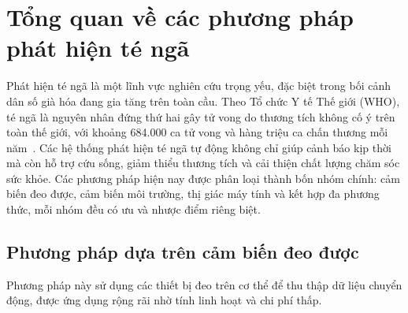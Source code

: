 \section{Tổng quan về các phương pháp phát hiện té ngã}

Phát hiện té ngã là một lĩnh vực nghiên cứu trọng yếu, đặc biệt trong bối cảnh dân số già hóa đang gia tăng trên toàn cầu. Theo Tổ chức Y tế Thế giới (WHO), té ngã là nguyên nhân đứng thứ hai gây tử vong do thương tích không cố ý trên toàn thế giới, với khoảng 684.000 ca tử vong và hàng triệu ca chấn thương mỗi năm~\cite{who2021}. Các hệ thống phát hiện té ngã tự động không chỉ giúp cảnh báo kịp thời mà còn hỗ trợ cứu sống, giảm thiểu thương tích và cải thiện chất lượng chăm sóc sức khỏe. Các phương pháp hiện nay được phân loại thành bốn nhóm chính: cảm biến đeo được, cảm biến môi trường, thị giác máy tính và kết hợp đa phương thức, mỗi nhóm đều có ưu và nhược điểm riêng biệt.

\subsection{Phương pháp dựa trên cảm biến đeo được}

Phương pháp này sử dụng các thiết bị đeo trên cơ thể để thu thập dữ liệu chuyển động, được ứng dụng rộng rãi nhờ tính linh hoạt và chi phí thấp.

